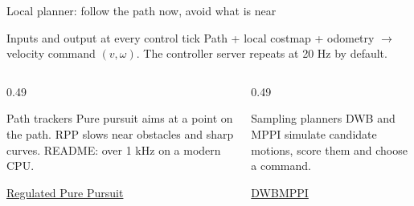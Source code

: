 \documentclass[aspectratio=169]{beamer}
\begin{document}
\begin{frame}[t]{Local planner: follow the path now, avoid what is near}
\small
\setlength{\abovedisplayskip}{1mm}\setlength{\belowdisplayskip}{1mm}
\setlength{\abovedisplayshortskip}{0pt}\setlength{\belowdisplayshortskip}{0pt}
\begin{block}{Inputs and output at every control tick}
Path + local costmap + odometry $\longrightarrow$ velocity command $(v,\omega)$. The controller server repeats at 20 Hz by default.
\end{block}\vspace{2mm}
\begin{columns}[T,onlytextwidth]\begin{column}{0.49\textwidth}
\begin{block}{Path trackers}
Pure pursuit aims at a point on the path. RPP slows near obstacles and sharp curves. README: over 1 kHz on a modern CPU.
\end{block}\vspace{2mm}
\href{https://github.com/ros-navigation/navigation2/tree/main/nav2_regulated_pure_pursuit_controller}{Regulated Pure Pursuit}\end{column}\begin{column}{0.49\textwidth}
\begin{block}{Sampling planners}
DWB and MPPI simulate candidate motions, score them and choose a command.
\end{block}\vspace{2mm}
\href{https://github.com/ros-navigation/navigation2/tree/main/nav2_dwb_controller}{DWB}\quad \href{https://github.com/ros-navigation/navigation2/tree/main/nav2_mppi_controller}{MPPI}\end{column}\end{columns}\par\vspace{1mm}{\scriptsize Defaults in the Nav2 repository; check your release.}
\end{frame}
\end{document}
